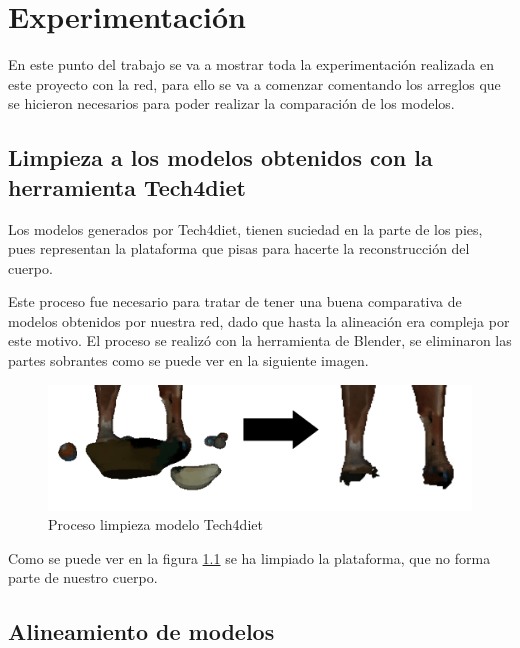 
\chapter{Experimentación}
\label{experimentacion}

En este punto del trabajo se va a mostrar toda la experimentación realizada en este proyecto con la red, para ello se va a comenzar comentando los arreglos que se hicieron necesarios para poder realizar la comparación de los modelos.

\section{Limpieza a los modelos obtenidos con la herramienta Tech4diet}

Los modelos generados por Tech4diet, tienen suciedad en la parte de los pies, pues representan la plataforma que pisas para hacerte la reconstrucción del cuerpo.

Este proceso fue necesario para tratar de tener una buena comparativa de modelos obtenidos por nuestra red, dado que hasta la alineación era compleja por este motivo. El proceso se realizó con la herramienta de Blender, se eliminaron las partes sobrantes como se puede ver en la siguiente imagen.

\begin{figure}[H]
	\centering
	\includegraphics[scale=1]{imagenes/experimentacion1.png}
	\caption{Proceso limpieza modelo Tech4diet}
	\label{fig:figura9}
\end{figure}

Como se puede ver en la figura \ref{fig:figura9} se ha limpiado la plataforma, que no forma parte de nuestro cuerpo.


\section{Alineamiento de modelos}

